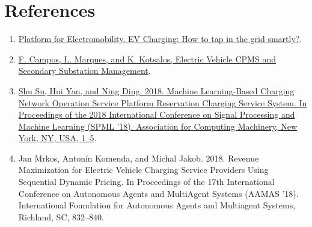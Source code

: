 \documentclass[11pt]{article}
\begin{document}
\section{References}
\label{section:references}

\begin{enumerate}
    \item \href{https://www.platformelectromobility.eu/2022/05/17/ev-charging-how-to-tap-in-the-grid-smartly/}{Platform for Electromobility. EV Charging: How to tap in the grid smartly?}.
    \item \href{https://mobilityintegrationsymposium.org/wp-content/uploads/sites/10/2018/11/4A_3_Emob18_024_paper_Filipe_Campos.pdf}{F. Campos, L. Marques, and K. Kotsalos, Electric Vehicle CPMS and Secondary Substation Management}.
    \item \href{https://doi.org/10.1145/3297067.3297078}{Shu Su, Hui Yan, and Ning Ding. 2018. Machine Learning-Based Charging Network Operation Service Platform Reservation Charging Service System. In Proceedings of the 2018 International Conference on Signal Processing and Machine Learning (SPML '18). Association for Computing Machinery, New York, NY, USA, 1–5}.
    \item Jan Mrkos, Antonín Komenda, and Michal Jakob. 2018. Revenue Maximization for Electric Vehicle Charging Service Providers Using Sequential Dynamic Pricing. In Proceedings of the 17th International Conference on Autonomous Agents and MultiAgent Systems (AAMAS '18). International Foundation for Autonomous Agents and Multiagent Systems, Richland, SC, 832–840.
\end{enumerate}
\end{document}
